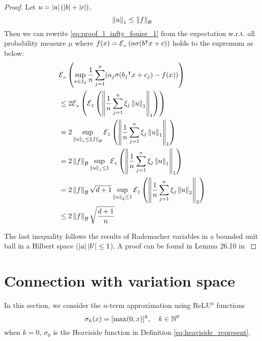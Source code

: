 \begin{proof}
    Let $u = \left| a \right| (\left| b \right| + \left| c \right|)$,
    \begin{equation}
        \left\| u \right\|_1 \leq \left\| f \right\|_{\mathcal{B}}      
    \end{equation}
    Then we can rewrite \eqref{eq:proof_l_infty_fouier_1} from the expectation
    w.r.t. all probability measure $\mu$ where $f(x) = \ERWi{\mu}{a \sigma(b\tr
    x + c)}$ holds to the supremum as below: 
    \begin{align}
        &\ERWi{\mu}{\sup_{x\in I_d} 
        \frac{1}{n} \sum_{j=1}^n (a_j\sigma(b_j\tr x + c_j) - f(x))} \\
        &\leq 2\ERWi{\mu}{
                \ERWi{\xi}{\norm{
                \frac{1}{n} \sum_{j=1}^{n}\xi_j \norm{u}_1}_1
            }
        } \\
        &= 2\sup_{\norm{u}_1 \leq \norm{f}_{\mcal{B}}} 
            \ERWi{\xi}{\norm{
                \frac{1}{n} \sum_{j=1}^{n}\xi_j\norm{u}_1}_1
            } \\
        &= 2\norm{f}_{\mcal{B}} \sup_{\norm{u}_1 \leq 1} 
            \ERWi{\xi}{\norm{
                \frac{1}{n} \sum_{j=1}^{n}\xi_j\norm{u}_1}_1
            } \\
        &= 2\norm{f}_{\mcal{B}} \sqrt{d+1} \sup_{\norm{u}_2 \leq 1} 
        \ERWi{\xi}{\norm{
            \frac{1}{n} \sum_{j=1}^{n}\xi_j\norm{u}_2}_2
        } \\
        &\leq 2\norm{f}_{\mcal{B}} \sqrt{\frac{d+1}{n}}
    \end{align}

    The last inequality follows the results of Rademacher variables in a bounded
    unit ball in a Hilbert space ($\left| a \right|\left| b' \right| \leq 1$). A proof can be
    found in Lemma 26.10 in \cite[p.
    383]{shalev-shwartzUnderstandingMachineLearning2014}
\end{proof}


\section{Connection with variation space}
\label{sec:infintie_width_variation_space}

In this section, we consider the $n$-term approximation using ReLU$^k$ functions
\begin{equation}
    \label{eq:reluk}
    \sigma_k(x) = [\max(0, x)]^k, \quad k \in \mathbb{N}^0
\end{equation}
when $k = 0$, $\sigma_0$ is the Heaviside function in Definition
\ref{eq:heaviside_represent}.

